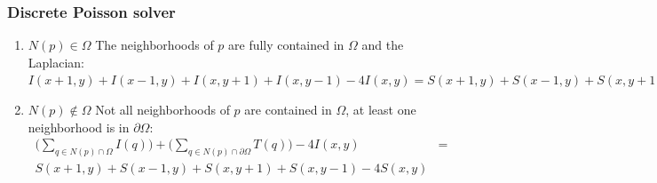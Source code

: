 \documentclass{beamer}
\begin{document}
\begin{frame}
    \frametitle{Discrete Poisson solver}    
        \begin{enumerate}
            \item $N(p) \in \Omega$ The neighborhoods of $p$ are fully contained in $\Omega$ and the Laplacian: 
            $I(x+1,y)+I(x-1,y)+I(x,y+1)+I(x,y-1)-4I(x,y)=S(x+1,y)+S(x-1,y)+S(x,y+1)+S(x,y-1)-4S(x,y)$
            \item $N(p) \notin \Omega$ Not all neighborhoods of $p$ are contained in $\Omega$, at least one neighborhood is in $\partial \Omega$:
            \[
                \begin{split}
                    \Bigg(\sum_{q \in N(p) \cap \Omega}I(q)\Bigg)     
                    +\Bigg(\sum_{q \in N(p) \cap \partial \Omega}T(q)\Bigg)     
                    -4I(x,y) &= \\ S(x+1,y)+S(x-1,y)+S(x,y+1)+S(x,y-1)-4S(x,y)
                \end{split}
            \]
        \end{enumerate}    
\end{frame} 
\end{document}
